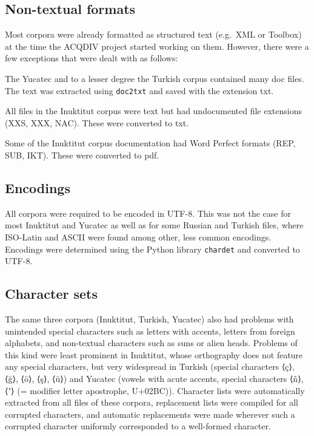 \documentclass[a4paper, 11pt]{book}
\begin{document}
\subsection{Non-textual formats}
Most corpora were already formatted as structured text (e.g.\ XML or Toolbox) at the time the ACQDIV project started working on them. However, there were a few exceptions that were dealt with as follows: 

\begin{itemize*}
	\item The Yucatec and to a lesser degree the Turkish corpus contained many doc files. The text was extracted using \texttt{doc2txt} and saved with the extension txt. 
	\item All files in the Inuktitut corpus were text but had undocumented file extensions (XXS, XXX, NAC). These were converted to txt. 
	\item Some of the Inuktitut corpus documentation had Word Perfect formats (REP, SUB, IKT). These were converted to pdf. 
\end{itemize*}

\subsection{Encodings}

All corpora were required to be encoded in UTF-8. This was not the case for most Inuktitut and Yucatec as well as for some Russian and Turkish files, where ISO-Latin and ASCII were found among other, less common encodings. Encodings were determined using the Python library \texttt{chardet} and converted to UTF-8.  

\subsection{Character sets}

The same three corpora (Inuktitut, Turkish, Yucatec) also had problems with unintended special characters such as letters with accents, letters from foreign alphabets, and non-textual characters such as suns or alien heads. Problems of this kind were least prominent in Inuktitut, whose orthography does not feature any special characters, but very widespread in Turkish (special characters ⟨ç⟩, ⟨ğ⟩, ⟨ö⟩, ⟨ş⟩, ⟨ü⟩) and Yucatec (vowels with acute accents, special characters ⟨ñ⟩, ⟨ʼ⟩ (= modifier letter apostrophe, U+02BC)). Character lists were automatically extracted from all files of these corpora, replacement lists were compiled for all corrupted characters, and automatic replacements were made wherever such a corrupted character uniformly corresponded to a well-formed character. 
\end{document}
